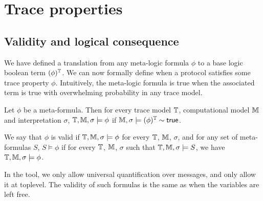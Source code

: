 \section{Trace properties}

\subsection{Validity and logical consequence}

We have defined a translation from any meta-logic formula $\phi$ to a base logic
boolean term $(\phi)^{\mathbb{T}}$. We can now formally define when a protocol
satisfies some trace property $\phi$.  Intuitively, the meta-logic formula is
true when the associated term is true with overwhelming probability in any trace model. %
\begin{definition}
  Let $\phi$ be a meta-formula. Then for every trace model $\mathbb{T}$, computational model $\mathbb{M}$ and interpretation $\sigma$, $\mathbb{T}, \mathbb{M}, \sigma \models \phi$ if $\mathbb{M}, \sigma \models (\phi)^{\mathbb{T}} \sim \textsf{true}$.

  We say that $\phi$ is valid if $\mathbb{T}, \mathbb{M}, \sigma \models \phi$ for every $\mathbb{T}$, $\mathbb{M}$, $\sigma$, and for any set of meta-formulas $S$, $S \models \phi$ if for every $\mathbb{T}$, $\mathbb{M}$, $\sigma$ such that $\mathbb{T}, \mathbb{M}, \sigma \models S$, we have $\mathbb{T}, \mathbb{M}, \sigma \models \phi$.
\end{definition}

\begin{remark}
  In the tool, we only allow universal quantification over messages, and
  only allow it at toplevel. The validity of such formulas is the same as
  when the variables are left free.
\end{remark}

